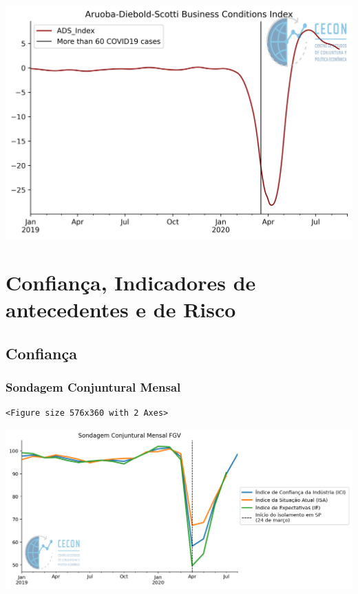 \documentclass[11pt]{article}
\begin{document}
\begin{center}
\includegraphics[width=.9\linewidth]{obipy-resources/62e383af79e91b63c7fc98dd7fb55b3c3ececcb9/cf14fa691a64e7d5e47f44565dc9f5363854ad6e.png}
\end{center}

\section{Confiança, Indicadores de antecedentes e de Risco}
\label{sec:org08c204f}

\subsection{Confiança}
\label{sec:org332f2f3}


\subsubsection{Sondagem Conjuntural Mensal}
\label{sec:org21ac13d}

\begin{verbatim}
<Figure size 576x360 with 2 Axes>
\end{verbatim}


\begin{center}
\includegraphics[width=.9\linewidth]{obipy-resources/62e383af79e91b63c7fc98dd7fb55b3c3ececcb9/7b3e58a37abae00e5e3eb5c1240536addcb36229.png}
\end{center}
\end{document}
